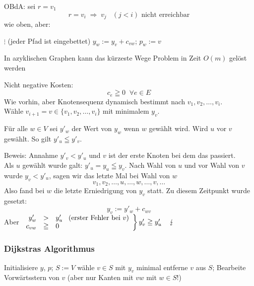 OBdA: sei $r=v_{1}$
\[ r=v_{i} \; \Rightarrow \; v_{j} \; \; \; (j < i) \mbox{ nicht erreichbar} \]
wie oben, aber:

\begin{algorithmic}
\STATE $\vdots$
\STATE (jeder Pfad ist eingebettet)
\STATE $y_{w} := y_{v} + c_{v w}$; $p_{w} := v$ 
\ENDIF
\ENDFOR
\ENDFOR
\end{algorithmic}

\begin{satz}
In azyklischen Graphen kann das kürzeste Wege Problem in Zeit $O(m)$
gelöst werden
\end{satz}

Nicht negative Kosten:
\[ c_{e} \geqq 0 \; \; \forall e \in E\]
Wie vorhin, aber Knotensequenz dynamisch bestimmt nach $v_{1}, v_{2},
\ldots, v_{i}$.\\
Wähle $v_{i+1} = v \in \{v_{1}, v_{2}, \ldots,v_{i}\}$ mit minimalem
$y_{v}$.

\begin{lemma} \label{UvorV}
Für alle $w \in V$ sei $y'_{w}$ der Wert von $y_{w}$ wenn $w$ gewählt wird.
Wird $u$ vor $v$ gewählt. So gilt $y'_{u} \leqq y'_{v}$.
\end{lemma}

Beweis: Annahme $y'_{v} < y'_{u}$ und $v$ ist der erste Knoten bei dem das
passiert.\\
Als $u$ gewählt wurde galt: $y'_{u} = y_{u} \leqq y_{v}$. Nach Wahl von $u$
und vor Wahl von $v$ wurde $y_{v} < y'_{u}$, sagen wir das letzte Mal
bei Wahl von $w$
\[v_{1}, v_{2}, \ldots, u, \ldots, w, \ldots,v,\ldots\]
Also fand bei $w$ die letzte Erniedrigung von $y_{v}$ statt. Zu diesem
Zeitpunkt wurde gesetzt:
\[y_{v} := y'_{w} + c_{w v}\]
Aber $\left. \begin{array}{rcl}
y'_{w} &>& y'_{u} \hspace{3mm} \mbox{(erster Fehler bei $v$)}\\
c_{v w} &\geqq& 0
\end{array}
\right\} y'_{v} \geqq y'_{u} \hspace{4mm} \lightning$

\subsubsection{Dijkstras Algorithmus}

\begin{algorithmic}
\STATE Initialisiere $y$, $p$;
\STATE $S := V$
\STATE wähle $v \in S$ mit $y_{v}$ minimal
\STATE entferne $v$ aus $S$;
\STATE Bearbeite Vorwärtsstern von $v$ (aber nur Kanten mit $vw$ mit $w \in
S$!)
\ENDWHILE
\end{algorithmic}


